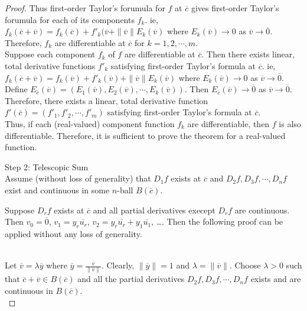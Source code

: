 \begin{proof}
	Thus first-order Taylor's forumula for $f$ at $\overline{c}$ gives first-order Taylor's forumula for each of its components $f_k$. ie, $f_k(\overline{c}+\overline{v}) = f_k(\overline{c}) + f'_k(\overline{v} + \|\overline{v}\|E_k(\overline{v})$ where $E_k(\overline{v}) \to 0$ as $\overline{v} \to \overline{0}$. Therefore, $f_k$ are differentiable at $\overline{c}$ for $k = 1,2,\cdots, m$.\\

	Suppose each component $f_k$ of $f$ are differentiable at $\overline{c}$. Then there exists linear, total derivative functions $f'_k$ satisfying first-order Taylor's formula at $\overline{c}$. ie, $f_k(\overline{c}+\overline{v}) = f_k(\overline{v}) + f'_k(\overline{v}) + \|\overline{v}\|E_k(\overline{v})$ where $E_k(\overline{v}) \to 0$ as $\overline{v} \to \overline{0}$.\\
	
	Define $E_{\overline{c}}(\overline{v}) = \left( E_1(\overline{v}), E_2(\overline{v}), \cdots, E_k(\overline{v}) \right)$. Then $E_{\overline{c}}(\overline{v}) \to \overline{0}$ as $\overline{v} \to \overline{0}$. Therefore, there exists a linear, total derivative function $f'(\overline{c}) = \left( f'_1, f'_2, \cdots, f'_m \right)$ satisfying first-order Taylor's formula at $\overline{c}$.\\

	Thus, if each (real-valued) component function $f_k$ are differentiable, then $f$ is also differentiable. Therefore, it is sufficient to prove the theorem for a real-valued function.\\

	\par{Step 2: } Telescopic Sum\\

	Assume (without loss of generality) that $D_1f$ exists at $\overline{c}$ and $D_2f,D_3f,\cdots,D_nf$ exist and continuous in some $n$-ball $B(\overline{c})$.\begin{commentary} Suppose $D_rf$ exists at $\overline{c}$ and all partial derivatives execept $D_rf$ are continuous. Then $v_0 = \overline{0}$, $v_1 = y_r\overline{u_r}$, $v_2 = y_r\overline{u_r} + y_1\overline{u_1}$, \dots. Then the following proof can be applied without any loss of generality. \end{commentary}\\

	Let $\overline{v} = \lambda\overline{y}$ where $\overline{y} = \frac{\overline{v}}{\|\overline{v}\|}$. Clearly, $\|\overline{y}\| = 1$ and $\lambda = \| \overline{v} \|$. Choose $\lambda > 0$ such that $\overline{c}+\overline{v} \in B(\overline{c})$ and all the partial derivatives $D_2f, D_3f, \cdots, D_nf$ exists and are continuous in $B(\overline{c})$.\\


\end{proof}
